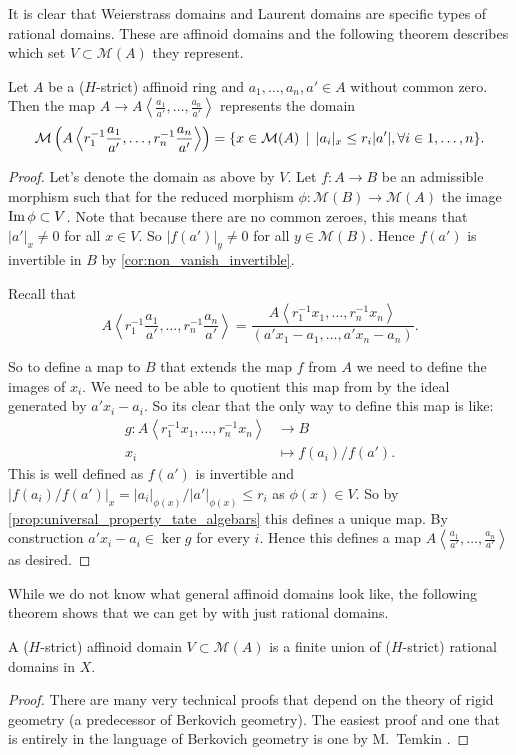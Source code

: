 It is clear that Weierstrass domains and Laurent domains are specific types of rational domains. 
These are affinoid domains and the following theorem describes which set $V \subset \mathcal{M} (A)$ they represent. 
\begin{proposition}
	Let $A$ be a ($H$-strict) affinoid ring and $a_1, \ldots, a_n, a' \in A$ without common zero.
	Then the map $A \to A\left<\frac{a_1}{a'}, \ldots, \frac{a_n}{a'} \right>$ represents the domain \[
		\mathcal{M} \left(A \left<r^{-1}_1\frac{a_1}{a'}, \ldots, r^{-1}_n\frac{a_n}{a'}\right> \right) = \{x \in \mathcal{M} (A) \st |a_i|_x \le r_i|a'|, \forall i \in 1, \ldots, n\} 
	.\] 
\end{proposition}
\begin{proof}
	Let's denote the domain as above by $V$. 
	Let $f:A \to B$ be an admissible morphism such that for the reduced morphism $\phi: \mathcal{M} (B) \to \mathcal{M} (A)$ the image $\im \phi \subset  V$.
	Note that because there are no common zeroes, this means that $|a'|_x \ne 0$ for all $x \in V$. 
	So $|f(a')|_{y} \ne 0$ for all $y \in \mathcal{M} (B)$. 
	Hence $f(a')$ is invertible in $B$ by \cref{cor:non_vanish_invertible}. 

	Recall that \[
	A\left<r^{-1}_1\frac{a_1}{a'}, \ldots, r_n^{-1}\frac{a_n}{a'} \right> = \frac{A\left<r_1^{-1}x_1, \ldots, r_n^{-1}x_n \right>}{(a' x_1 - a_1, \ldots, a' x_n - a_n)}
	.\] 

	So to define a map to $B$ that extends the map $f$ from $A$ we need to define the images of $x_i$. 
	We need to be able to quotient this map from by the ideal generated by $a'x_i - a_i$. 
	So its clear that the only way to define this map is like:
	\begin{align*}
		g: A\left<r_1^{-1}x_1, \ldots, r_n^{-1}x_n \right> &\longrightarrow B \\
		x_i &\longmapsto f(a_i) / f(a')
	.\end{align*}
	This is well defined as $f(a')$ is invertible and $|f(a_i) / f(a')|_x = |a_i|_{\phi(x)} / |a'|_{\phi(x)} \le r_i$ as $\phi(x) \in V$. 
	So by \cref{prop:universal_property_tate_algebars} this defines a unique map. 
	By construction $a'x_i - a_i \in \ker g$ for every $i$. Hence this defines a map $A \left<\frac{a_1}{a'}, \ldots, \frac{a_n}{a'} \right>$ as desired. 
\end{proof}

While we do not know what general affinoid domains look like, the following theorem shows that we can get by with just rational domains. 
\begin{proposition}
	A ($H$-strict) affinoid domain $V \subset  \mathcal{M} (A)$ is a finite union of ($H$-strict) rational domains in $X$.
\end{proposition}
\begin{proof}
	There are many very technical proofs that depend on the theory of rigid geometry (a predecessor of Berkovich geometry).
	The easiest proof and one that is entirely in the language of Berkovich geometry is one by M.\ Temkin \cite{temkinNewProofGerritzenGrauert2005}.
\end{proof}




